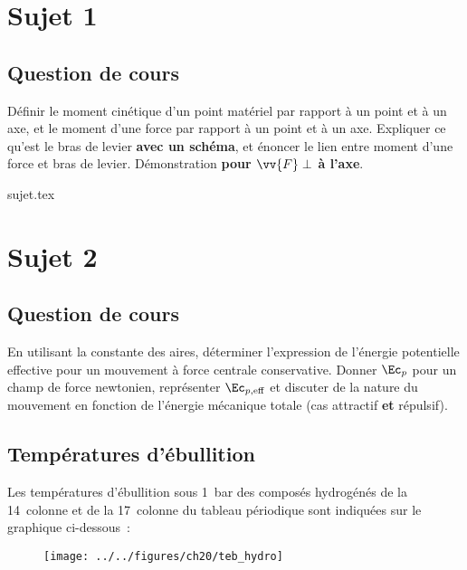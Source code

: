 \documentclass[a4paper, 11pt]{book}
\begin{document}
\chapter{Sujet 1}
\section{Question de cours}

Définir le moment cinétique d'un point matériel par rapport à un point et à un
axe, et le moment d'une force par rapport à un point et à un axe. Expliquer ce
qu'est le bras de levier \textbf{avec un schéma}, et énoncer le lien entre
moment d'une force et bras de levier. Démonstration \textbf{pour $\vv{F} \perp$
à l'axe}.

\resetQ
{sujet.tex}

\chapter{Sujet 2}
\section{Question de cours}

En utilisant la constante des aires, déterminer l'expression de l'énergie
potentielle effective pour un mouvement à force centrale conservative. Donner
$\Ec_p$ pour un champ de force newtonien,  représenter $\Ec_{p,\rm eff}$ et
discuter de la nature du mouvement en fonction de l'énergie mécanique totale
(cas attractif \textbf{et} répulsif).

\resetQ
\section{Températures d'ébullition}
Les températures d'ébullition sous \SI{1}{bar} des composés hydrogénés de la
14\ieme\ colonne et de la 17\ieme\ colonne du tableau périodique sont indiquées
sur le graphique ci-dessous~:

\begin{figure}[]
    \centering
    \texttt{[image: ../../figures/ch20/teb\_hydro]}
    \label{fig:tebhydro}
\end{figure}
\end{document}
